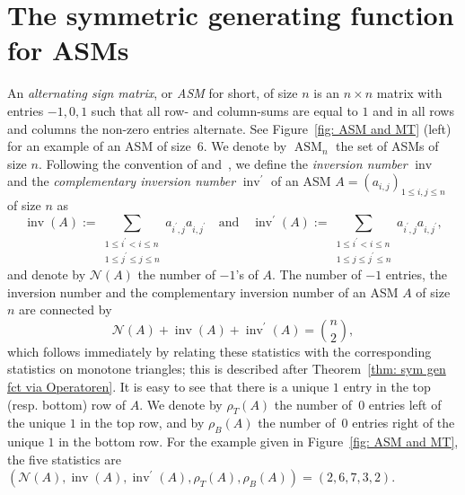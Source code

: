 \documentclass[11pt]{article}
\theoremstyle{definition}
\numberwithin{equation}{section}
\DeclareMathOperator{\ASM}{ASM}
\DeclareMathOperator{\inv}{inv}
\newcounter{x}
\newcounter{y}
\newcounter{z}
\begin{document}
\section{The symmetric generating function for ASMs}
\label{sec: ASM gen fct}

An \emph{alternating sign matrix}, or \emph{ASM} for short, of size $n$ is an $n \times n$ matrix with entries $-1,0,1$ such that all row- and column-sums are equal to $1$ and in all rows and columns the non-zero entries alternate. See Figure~\ref{fig: ASM and MT} (left) for an example of an ASM of size~$6$. We denote by $\ASM_n$ the set of ASMs of size $n$. 
Following the convention of \cite[Eq. 18]{RobbinsRumsey86} and~\cite{Fischer18}, we define the \emph{inversion number} $\inv$ and the \emph{complementary inversion number} $\inv^\prime$ of an ASM $A=(a_{i,j})_{1 \leq i,j \leq n}$ of size $n$ as
\[
\inv(A):= \sum_{\substack{1 \leq i^\prime < i \leq n \\ 1 \leq j^\prime \leq j \leq n}}a_{i^\prime, j}a_{i,j^\prime} \quad \text{and} \quad
\inv^\prime(A):= \sum_{\substack{1 \leq i^\prime < i \leq n \\ 1 \leq j \leq j^\prime \leq n}}a_{i^\prime, j}a_{i,j^\prime},
\]
and denote by $\mathcal{N}(A)$ the number of $-1$'s of $A$.  The number of $-1$ entries, the inversion number and the complementary inversion number of an ASM $A$ of size $n$ are connected by
\[
\mathcal{N}(A)+\inv(A)+\inv^\prime(A)=\binom{n}{2},
\]
which follows immediately by relating these statistics with the corresponding statistics on monotone triangles; this is described after Theorem~\ref{thm: sym gen fct via Operatoren}.
It is easy to see that there is a unique $1$ entry in the top (resp. bottom) row of $A$. We denote by $\rho_T(A)$ the number of~$0$ entries left of the unique $1$ in the top row, and by $\rho_B(A)$ the number of~$0$ entries right of the unique $1$ in the bottom row.
For the example given in Figure~\ref{fig: ASM and MT}, the five statistics are $(\mathcal{N}(A),\inv(A),\inv^\prime(A),\rho_T(A),\rho_B(A))=(2,6,7,3,2)$.
\end{document}
